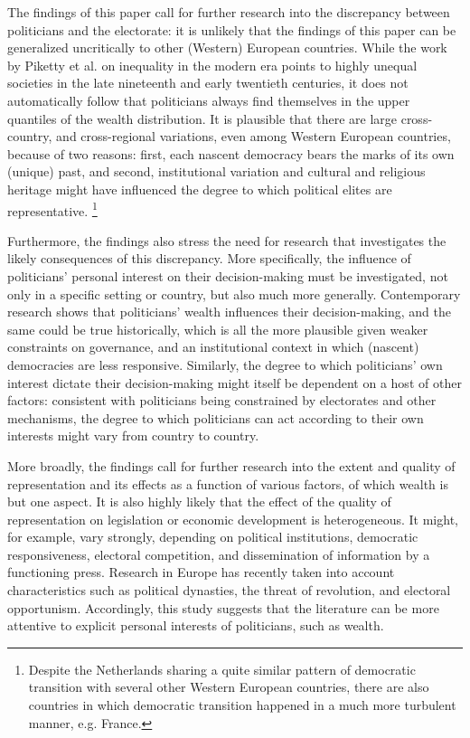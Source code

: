     The findings of this paper call for further research into the discrepancy between politicians and the electorate: it is unlikely that the findings of this paper can be generalized uncritically to other (Western) European countries. While the work by Piketty et al. on inequality in the modern era points to highly unequal societies in the late nineteenth and early twentieth centuries, it does not automatically follow that politicians always find themselves in the upper quantiles of the wealth distribution. \autocite{piketty2003income, piketty2014inequality} It is plausible that there are large cross-country, and cross-regional variations, even among Western European countries, because of two reasons: first, each nascent democracy bears the marks of its own (unique) past, and second, institutional variation and cultural and religious heritage might have influenced the degree to which political elites are representative. \autocite{acemoglu2011consequences} \footnote{Despite the Netherlands sharing a quite similar pattern of democratic transition with several other Western European countries, there are also countries in which democratic transition happened in a much more turbulent manner, e.g. France. }

    Furthermore, the findings also stress the need for research that investigates the likely consequences of this discrepancy. More specifically, the influence of politicians' personal interest on their decision-making must be investigated, not only in a specific setting or country, but also much more generally. Contemporary research shows that politicians' wealth influences their decision-making, and the same could be true historically, which is all the more plausible given weaker constraints on governance, and an institutional context in which (nascent) democracies are less responsive. \autocite{tahoun2019personal} Similarly, the  degree to which politicians' own interest dictate their decision-making might itself be dependent on a host of other factors: consistent with politicians being constrained by electorates and other mechanisms, the degree to which politicians can act according to their own interests might vary from country to country. \autocite{djankov2010disclosure}

    More broadly, the findings call for further research into the extent and quality of representation and its effects as a function of various factors, of which wealth is but one aspect. It is also highly likely that the effect of the quality of representation on legislation or economic development is heterogeneous. It might, for example, vary strongly, depending on political institutions, democratic responsiveness, electoral competition, and dissemination of information by a functioning press. Research in Europe has recently taken into account characteristics such as political dynasties, the threat of revolution, and electoral opportunism. \autocite{aidt2014workers, oosterlinck2020positive, aidt2019motivates} Accordingly, this study suggests that the literature can be more attentive to explicit personal interests of politicians, such as wealth. 

